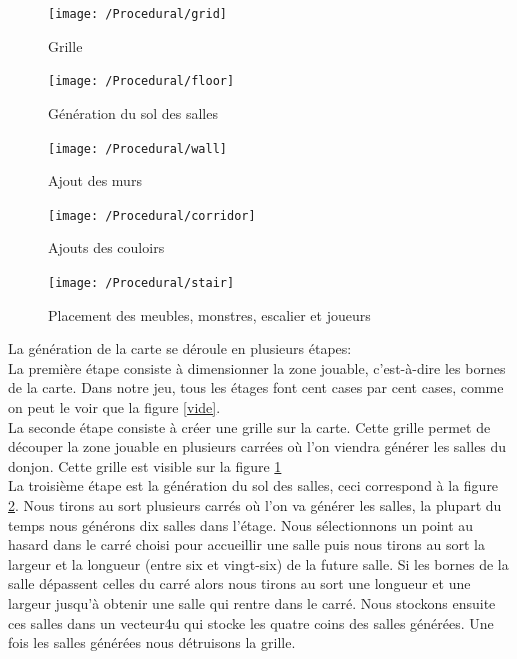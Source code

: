 \documentclass[a4paper, 12pt, twoside]{article}
\begin{document}
\begin{figure}[H]
    \center
    \texttt{[image: /Procedural/grid]}
    \caption{Grille}
    \label{grid}
\end{figure}

\begin{figure}[H]
    \center
    \texttt{[image: /Procedural/floor]}
    \caption{Génération du sol des salles}
    \label{floor}
\end{figure}

\begin{figure}[H]
    \center
    \texttt{[image: /Procedural/wall]}
    \caption{Ajout des murs}
    \label{wall}
\end{figure}

\begin{figure}[H]
    \center
    \texttt{[image: /Procedural/corridor]}
    \caption{Ajouts des couloirs}
    \label{corridor}
\end{figure}

\begin{figure}[H]
    \center
    \texttt{[image: /Procedural/stair]}
    \caption{Placement des meubles, monstres, escalier et joueurs}
    \label{stair}
\end{figure}

La génération de la carte se déroule en plusieurs étapes: \\

La première étape consiste à dimensionner la zone jouable, c'est-à-dire les bornes de la carte. Dans notre jeu, tous les étages font cent cases par cent cases, comme on peut le voir que la figure \ref{vide}.  \\

La seconde étape consiste à créer une grille sur la carte. Cette grille permet de découper la zone jouable en plusieurs carrées où l'on viendra générer les salles du donjon. Cette grille est visible sur la figure \ref{grid}  \\

La troisième étape est la génération du sol des salles, ceci correspond à la figure \ref{floor}. Nous tirons au sort plusieurs carrés où l'on va générer les salles, la plupart du temps nous générons dix salles dans l'étage. Nous sélectionnons un point au hasard dans le carré choisi pour accueillir une salle puis nous tirons au sort la largeur et la longueur (entre six et vingt-six) de la future salle. Si les bornes de la salle dépassent celles du carré alors nous tirons au sort une longueur et une largeur jusqu'à obtenir une salle qui rentre dans le carré. Nous stockons ensuite ces salles dans un vecteur4u qui stocke les quatre coins des salles générées. Une fois les salles générées nous détruisons la grille. \\
\end{document}
